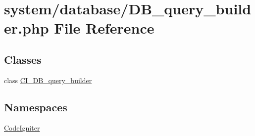 \hypertarget{_d_b__query__builder_8php}{}\section{system/database/\+D\+B\+\_\+query\+\_\+builder.php File Reference}
\label{_d_b__query__builder_8php}
\subsection*{Classes}
\begin{DoxyCompactItemize}
\item 
class \mbox{\hyperlink{class_c_i___d_b__query__builder}{C\+I\+\_\+\+D\+B\+\_\+query\+\_\+builder}}
\end{DoxyCompactItemize}
\subsection*{Namespaces}
\begin{DoxyCompactItemize}
\item 
 \mbox{\hyperlink{namespace_code_igniter}{Code\+Igniter}}
\end{DoxyCompactItemize}
